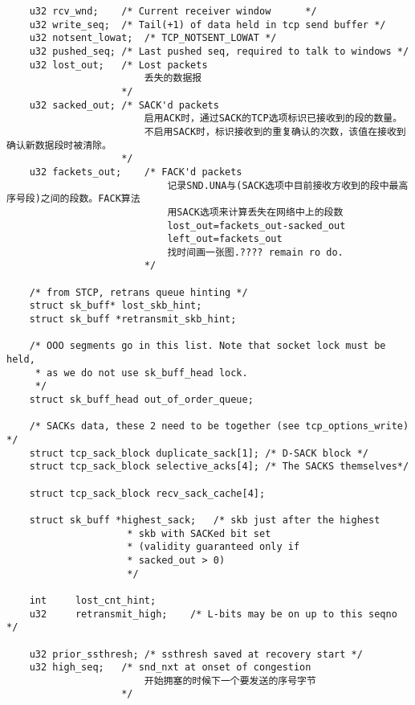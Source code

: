 \begin{verbatim}
    u32 rcv_wnd;    /* Current receiver window      */
    u32 write_seq;  /* Tail(+1) of data held in tcp send buffer */
    u32 notsent_lowat;  /* TCP_NOTSENT_LOWAT */
    u32 pushed_seq; /* Last pushed seq, required to talk to windows */
    u32 lost_out;   /* Lost packets         
                        丢失的数据报
                    */
    u32 sacked_out; /* SACK'd packets           
                        启用ACK时，通过SACK的TCP选项标识已接收到的段的数量。
                        不启用SACK时，标识接收到的重复确认的次数，该值在接收到确认新数据段时被清除。
                    */
    u32 fackets_out;    /* FACK'd packets           
                            记录SND.UNA与(SACK选项中目前接收方收到的段中最高序号段)之间的段数。FACK算法
                            用SACK选项来计算丢失在网络中上的段数
                            lost_out=fackets_out-sacked_out
                            left_out=fackets_out
                            找时间画一张图.???? remain ro do.
                        */

    /* from STCP, retrans queue hinting */
    struct sk_buff* lost_skb_hint;
    struct sk_buff *retransmit_skb_hint;

    /* OOO segments go in this list. Note that socket lock must be held,
     * as we do not use sk_buff_head lock.
     */
    struct sk_buff_head out_of_order_queue;

    /* SACKs data, these 2 need to be together (see tcp_options_write) */
    struct tcp_sack_block duplicate_sack[1]; /* D-SACK block */
    struct tcp_sack_block selective_acks[4]; /* The SACKS themselves*/

    struct tcp_sack_block recv_sack_cache[4];

    struct sk_buff *highest_sack;   /* skb just after the highest
                     * skb with SACKed bit set
                     * (validity guaranteed only if
                     * sacked_out > 0)
                     */

    int     lost_cnt_hint;
    u32     retransmit_high;    /* L-bits may be on up to this seqno */

    u32 prior_ssthresh; /* ssthresh saved at recovery start */
    u32 high_seq;   /* snd_nxt at onset of congestion   
                        开始拥塞的时候下一个要发送的序号字节                    
                    */


\end{verbatim}
